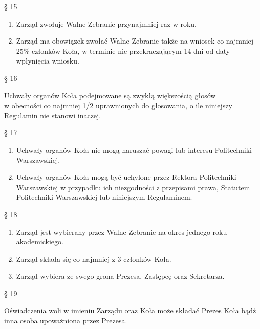 \documentclass[a4paper,11pt]{article}
\renewcommand{\paragraph}[1] {\begin{center}§ {#1}\end{center}}
\newcommand{\content}[1] {\begin{flushleft}{#1}\end{flushleft}}
\begin{document}
\paragraph{15}
\begin{enumerate}
	\item Zarząd zwołuje Walne Zebranie przynajmniej raz w roku.
	\item Zarząd ma obowiązek zwołać Walne Zebranie także na wniosek co najmniej  25\% członków 
Koła, w terminie nie przekraczającym 14 dni od daty wpłynięcia wniosku.
\end{enumerate}

\paragraph{16}
\content{Uchwały organów Koła podejmowane są zwykłą większością głosów \\ w obecności co najmniej 1/2 uprawnionych do głosowania, o ile niniejszy Regulamin nie stanowi inaczej.}

\paragraph{17}
\begin{enumerate}
	\item Uchwały organów Koła nie mogą  naruszać powagi lub interesu Politechniki Warszawskiej.
	\item Uchwały organów Koła mogą być uchylone przez Rektora Politechniki Warszawskiej w
przypadku ich niezgodności z przepisami prawa, Statutem Politechniki Warszawskiej lub
niniejszym Regulaminem.
\end{enumerate}

\paragraph{18}
\begin{enumerate}
	\item Zarząd jest wybierany przez Walne Zebranie na okres jednego roku akademickiego.
	\item Zarząd składa się co najmniej z 3 członków Koła.
	\item Zarząd wybiera ze swego grona Prezesa, Zastępcę oraz Sekretarza.
\end{enumerate}

\paragraph{19}
\content{Oświadczenia woli w imieniu Zarządu oraz Koła może składać Prezes Koła bądź inna osoba
upoważniona przez Prezesa.}
\end{document}
